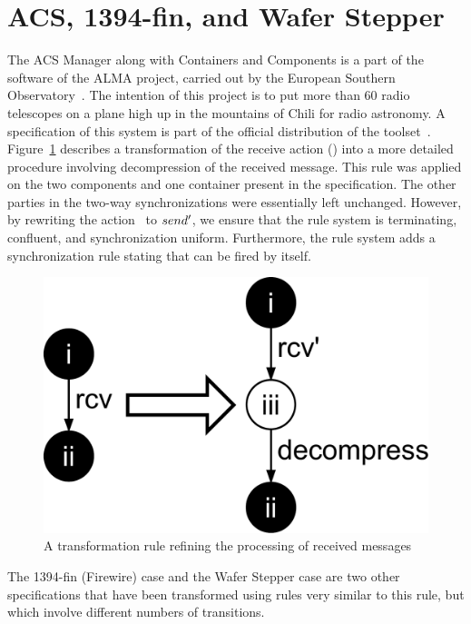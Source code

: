\section{ACS, 1394-fin, and Wafer Stepper}
The ACS Manager along with Containers and Components is a part of the software of the ALMA project, carried out by the European Southern Observatory~\cite{ploeger.alma}.
The intention of this project is to put more than 60 radio telescopes on a plane high up in the mountains of Chili for radio astronomy.
A specification of this system is part of the official distribution of the \mCRLTwo toolset~\cite{mcrl2}.
Figure~\ref{fig:prop-pres-case-studies:acs-rules} describes a transformation of the receive action () into a more detailed procedure involving decompression of the received message.
This rule was applied on the two components and one container present in the specification.
The other parties in the two-way synchronizations were essentially left unchanged.
However, by rewriting the action~ to $send'$, we ensure that the rule system is terminating, confluent, and synchronization uniform.
Furthermore, the rule system adds a synchronization rule stating that  can be fired by itself.

\begin{figure}[hbt]
\centering
\includegraphics[scale=0.2]{prop-pres-case-studies/figs/acs-rules}
\caption{A transformation rule refining the processing of received messages}
\label{fig:prop-pres-case-studies:acs-rules}
\end{figure}

The 1394-fin (Firewire) case and the Wafer Stepper case are two other \mCRLTwo specifications that have been transformed using rules very similar to this rule, but which involve different numbers of transitions.